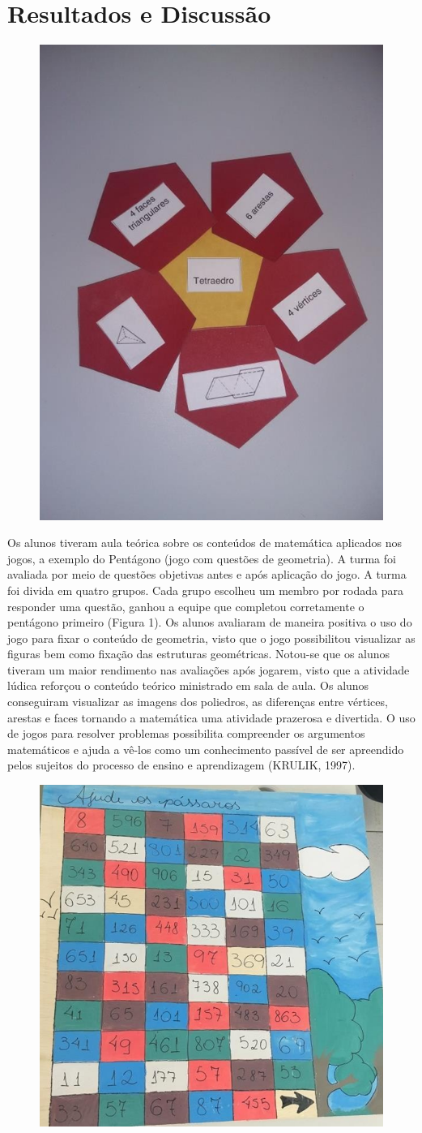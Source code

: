 \documentclass[article,12pt,onesidea,4paper,english,brazil]{abntex2}
\begin{document}
	\section*{Resultados e Discussão}
	
\begin{figure}[h]
	\centering
	\includegraphics[width=0.3\linewidth]{pip09.png}
	\caption{}
\end{figure}
Os alunos tiveram aula teórica sobre os conteúdos de matemática aplicados nos jogos, a exemplo do Pentágono (jogo com questões de geometria). A turma foi avaliada por meio de questões objetivas antes e após aplicação do jogo. A turma foi divida em quatro grupos. Cada grupo escolheu um membro por rodada para responder uma questão, ganhou a equipe que completou corretamente o pentágono primeiro (Figura 1).
Os alunos avaliaram de maneira positiva o uso do jogo para fixar o conteúdo de geometria, visto que o jogo possibilitou visualizar as figuras bem como fixação das estruturas geométricas. Notou-se que os alunos tiveram um maior rendimento nas avaliações após jogarem, visto que a atividade lúdica reforçou o conteúdo teórico ministrado em sala de aula.
Os alunos conseguiram visualizar as imagens dos poliedros, as diferenças entre vértices, arestas e faces tornando a matemática uma atividade prazerosa e divertida. O uso de jogos para resolver problemas possibilita compreender os argumentos matemáticos e ajuda a vê-los como um conhecimento passível de ser apreendido pelos sujeitos do processo de ensino e aprendizagem (KRULIK, 1997).

\begin{figure}[h]
	\centering
	\includegraphics[width=0.3\linewidth]{pip09-2.png}
	\caption{}
\end{figure}
\end{document}
